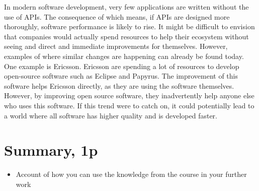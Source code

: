 \documentclass{article}
\begin{document}
In modern software development, very few applications are written without the use of APIs. The consequence of which means, if APIs are designed more thoroughly, software performance is likely to rise. It might be difficult to envision that companies would actually spend resources to help their ecosystem without seeing and direct and immediate improvements for themselves. However, examples of where similar changes are happening can already be found today. One example is Ericsson. Ericsson are spending a lot of resources to develop open-source software such as Eclipse and Papyrus. The improvement of this software helps Ericsson directly, as they are using the software themselves. However, by improving open source software, they inadvertently help anyone else who uses this software. If this trend were to catch on, it could potentially lead to a world where all software has higher quality and is developed faster. 

\section{Summary, 1p}

\begin{itemize}
	\item Account of how you can use the knowledge from the course in your further work
\end{itemize}




\end{document}
